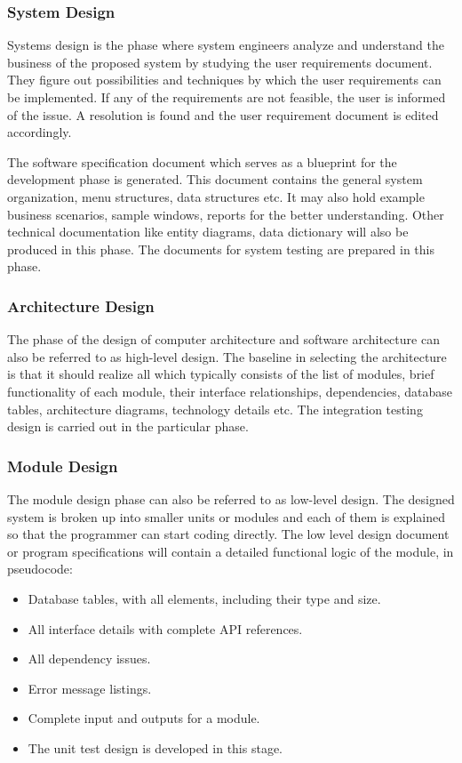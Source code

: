 \documentclass[a4paper,14pt,onecolumn]{article}
\begin{document}
\subsubsection{System Design}
\begin{sloppypar}
Systems design is the phase where system engineers analyze and understand the business of the proposed system by studying the user requirements document. They figure out possibilities and techniques by which the user requirements can be implemented. If any of the requirements are not feasible, the user is informed of the issue. A resolution is found and the user requirement document is edited accordingly.\end{sloppypar}
\begin{sloppypar}
The software specification document which serves as a blueprint for the development phase is generated. This document contains the general system organization, menu structures, data structures etc. It may also hold example business scenarios, sample windows, reports for the better understanding. Other technical documentation like entity diagrams, data dictionary will also be produced in this phase. The documents for system testing are prepared in this phase.
\end{sloppypar}

\subsubsection{Architecture Design}
   The phase of the design of computer architecture and software architecture can also be referred to as high-level design. The baseline in selecting the architecture is that it should realize all which typically consists of the list of modules, brief functionality of each module, their interface relationships, dependencies, database tables, architecture diagrams, technology details etc. The integration testing design is carried out in the particular phase.

\subsubsection{Module Design}
The module design phase can also be referred to as low-level design. The designed system is broken up into smaller units or modules and each of them is explained so that the programmer can start coding directly. The low level design document or program specifications will contain a detailed functional logic of the module, in pseudocode:
   \begin{itemize}
   \item Database tables, with all elements, including their type and size.
   \item All interface details with complete API references.
   \item All dependency issues.
   \item 	Error message listings.
   \item Complete input and outputs for a module.
   \item The unit test design is developed in this stage.
   \end{itemize}
\end{document}
